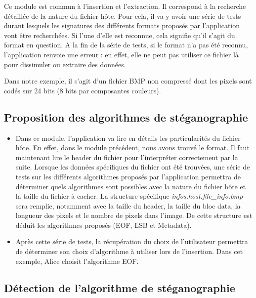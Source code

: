\documentclass[11pt]{article}
\begin{document}
Ce module est commun à l'insertion et l'extraction. Il correspond à la 
recherche détaillée de la nature du fichier hôte. 
Pour cela, il va y avoir une série de tests durant lesquels les
signatures des différents formats proposés par l'application vont être recherchées. 
Si l'une d'elle est reconnue, cela signifie qu'il s'agit du format en question. 
A la fin de la série de tests, si le format n'a pas été reconnu, 
l'application renvoie une erreur : en effet, elle ne peut pas utiliser ce 
fichier là pour dissimuler ou extraire des données. 

Dans notre exemple, il s'agit d'un fichier BMP non compressé dont les 
pixels sont codés sur 24 bits (8 bits par composantes couleurs). 

\subsection{Proposition des algorithmes de stéganographie}

\begin{itemize}
\item Dans ce module, l'application va lire en détails les particularités du fichier 
hôte. En effet, dans le module précédent, nous avons trouvé le format. Il 
faut maintenant lire le header du fichier pour l'interpréter correctement 
par la suite. Lorsque les données spécifiques du fichier ont été trouvées, 
une série de tests sur les différents algorithmes proposés par l'application
permettra de déterminer quels algorithmes sont possibles avec la nature 
du fichier hôte et la taille du fichier à cacher. 
\newline 
La structure spécifique \textit{infos.host.file\_info.bmp} sera remplie, 
notamment avec la taille du header, la taille du bloc data, la longueur 
des pixels et le nombre de pixels dans l'image. De cette structure
est déduit les algorithmes proposés (EOF, LSB et Metadata). 
\newline
\item Après cette série de tests, la récupération du choix de l'utilisateur 
permettra de déterminer son choix d'algorithme à utiliser lors de l'insertion. 
\newline 
Dans cet exemple, Alice choisit l'algorithme EOF. 
\end{itemize}

\subsection{Détection de l'algorithme de stéganographie}
\end{document}
